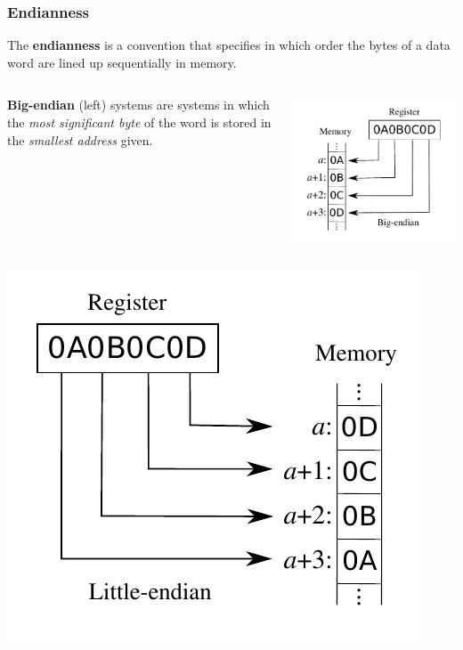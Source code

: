 \documentclass[]{beamer}
\begin{document}
\begin{frame}
  \frametitle{Endianness}
  The \textbf{endianness} is a convention that specifies in which order the bytes of a data word are lined up sequentially in memory.
  \begin{columns}
    \begin{column}{0.72\columnwidth}
      \textbf{Big-endian} (left) systems are systems in which the \emph{most significant byte} of the word is stored in the \emph{smallest address} given.
    \end{column}
    \begin{column}{0.28\columnwidth}
      \includegraphics[width=\textwidth]{images/Big-Endian.pdf}
      \label{Big-Endian}
    \end{column}
  \end{columns}
  \begin{columns}
    \begin{column}{0.28\columnwidth}
      \includegraphics[width=\textwidth]{images/Little-Endian.pdf}
      \label{Little-Endian}


\end{column}
\end{columns}
\end{frame}
\end{document}
